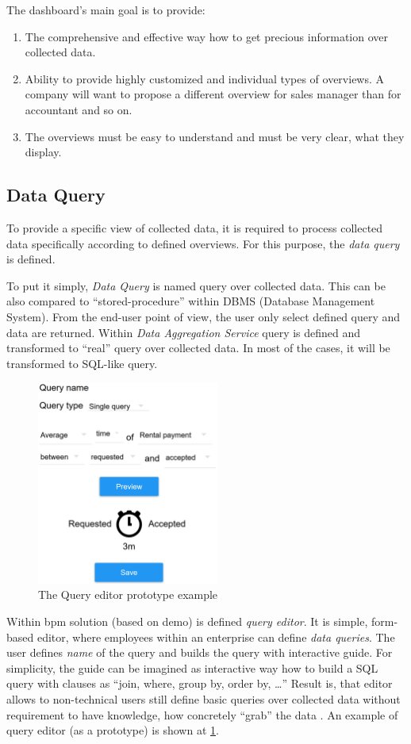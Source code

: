 The dashboard's main goal is to provide:
\begin{enumerate}
\item The comprehensive and effective way how to get precious information over collected data.
\item Ability to provide highly customized and individual types of overviews. A company will want to propose a different overview for sales manager than for accountant and so on. 
\item The overviews must be easy to understand and must be very clear, what they display.
\end{enumerate}
\subsection{Data Query}
To provide a specific view of collected data, it is required to process collected data specifically according to defined overviews. For this purpose, the \textit{data query} is defined.

To put it simply, \textit{Data Query} is named query over collected data. This can be also compared to ``stored-procedure'' within DBMS (Database Management System). From the end-user point of view, the user only select defined query and data are returned. Within \textit{Data Aggregation Service} query is defined and transformed to ``real'' query over collected data. In most of the cases, it will be transformed to SQL-like query. 

\begin{figure}[ht!]
\centering
\includegraphics[width=6cm,keepaspectratio]{img/query-editor}
\caption{The Query editor prototype example}
\label{fig:query-editor}
\end{figure}

Within \gls{bpm} solution (based on \gls{demo}) is defined \textit{query editor}. It is simple, form-based editor, where employees within an enterprise can define \textit{data queries}. The user defines \textit{name} of the query and builds the query with interactive guide. For simplicity, the guide can be imagined as interactive way how to build a SQL query with clauses as ``join, where, group by, order by, \dots'' Result is, that editor allows to non-technical users still define basic queries over collected data without requirement to have knowledge, how concretely ``grab'' the data . An example of query editor (as a prototype) is shown at \cref{fig:query-editor}.

